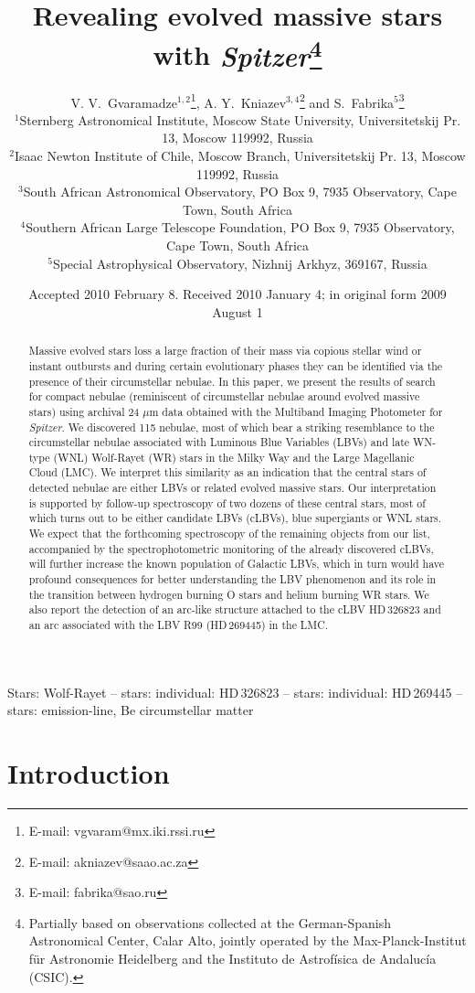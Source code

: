 \documentclass[useAMS]{mn2e}
\title[Revealing evolved massive stars with {\it Spitzer}]{Revealing evolved massive
stars with {\it Spitzer}\footnotemark[0]\thanks{Partially based on observations collected
at the German-Spanish Astronomical Center,
Calar Alto, jointly operated by the Max-Planck-Institut f\"ur Astronomie
Heidelberg and the  Instituto de Astrof\'isica de Andaluc\'ia (CSIC).}}
\author[V.V.Gvaramadze, A.Y.Kniazev and S.Fabrika]
       {V. V.~Gvaramadze$^{1,2}$\thanks{E-mail: vgvaram@mx.iki.rssi.ru },
       A. Y.~Kniazev$^{3,4}$\thanks{E-mail: akniazev@saao.ac.za} and
       S.~Fabrika$^{5}$\thanks{E-mail: fabrika@sao.ru}\\
       $^{1}$Sternberg Astronomical Institute, Moscow State University,
       Universitetskij Pr. 13, Moscow 119992, Russia\\
       $^{2}$Isaac Newton Institute of Chile, Moscow Branch, Universitetskij Pr. 13, Moscow 119992,
       Russia\\
       $^{3}$South African Astronomical Observatory, PO Box 9, 7935 Observatory, Cape Town,
       South Africa \\
       $^{4}$Southern African Large Telescope Foundation, PO Box 9, 7935 Observatory, Cape Town,
       South Africa \\
       $^{5}$Special Astrophysical Observatory, Nizhnij Arkhyz, 369167, Russia
       }
\begin{document}
\date{Accepted 2010 February 8. Received 2010 January 4; in original form 2009 August 1}


\maketitle

\begin{abstract}
Massive evolved stars loss a large fraction of their mass via
copious stellar wind or instant outbursts and during certain
evolutionary phases they can be identified via the presence of their
circumstellar nebulae. In this paper, we present the results of
search for compact nebulae (reminiscent of circumstellar nebulae
around evolved massive stars) using archival 24 $\mu$m data obtained
with the Multiband Imaging Photometer for {\it Spitzer}. We
discovered 115 nebulae, most of which bear a striking resemblance to
the circumstellar nebulae associated with Luminous Blue Variables
(LBVs) and late WN-type (WNL) Wolf-Rayet (WR) stars in the Milky Way
and the Large Magellanic Cloud (LMC). We interpret this similarity
as an indication that the central stars of detected nebulae are
either LBVs or related evolved massive stars. Our interpretation is
supported by follow-up spectroscopy of two dozens of these central
stars, most of which turns out to be either candidate LBVs (cLBVs),
blue supergiants or WNL stars. We expect that the forthcoming
spectroscopy of the remaining objects from our list, accompanied by
the spectrophotometric monitoring of the already discovered cLBVs,
will further increase the known population of Galactic LBVs, which
in turn would have profound consequences for better understanding
the LBV phenomenon and its role in the transition between hydrogen
burning O stars and helium burning WR stars. We also report the
detection of an arc-like structure attached to the cLBV HD\,326823
and an arc associated with the LBV R99 (HD\,269445) in the LMC.
\end{abstract}

\begin{keywords}
Stars: Wolf-Rayet -- stars: individual: HD\,326823 -- stars:
individual: HD\,269445 -- stars: emission-line, Be circumstellar
matter
\end{keywords}

\section{Introduction}
%
\end{document}

